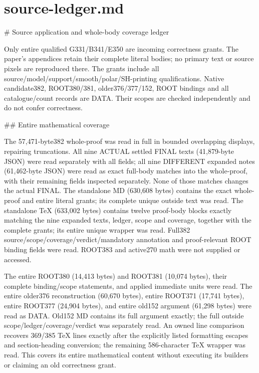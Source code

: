 \documentclass[11pt]{article}
\begin{document}
\appendix

\section{source-ledger.md}

\begin{ImportedQualifiedGrant}

# Source application and whole-body coverage ledger

Only entire qualified G331/B341/E350 are incoming correctness grants. The paper's appendices retain their complete literal bodies; no primary text or source pixels are reproduced there. The grants include all source/model/support/smooth/polar/SH-printing qualifications. Native candidate382, ROOT380/381, older376/377/152, ROOT bindings and all catalogue/count records are DATA. Their scopes are checked independently and do not confer correctness.

## Entire mathematical coverage

The 57,471-byte382 whole-proof was read in full in bounded overlapping displays, repairing truncations. All nine ACTUAL settled FINAL texts (41,879-byte JSON) were read separately with all fields; all nine DIFFERENT expanded notes (61,462-byte JSON) were read as exact full-body matches into the whole-proof, with their remaining fields inspected separately. None of those matches changes the actual FINAL. The standalone MD (630,608 bytes) contains the exact whole-proof and entire literal grants; its complete unique outside text was read. The standalone TeX (633,002 bytes) contains twelve proof-body blocks exactly matching the nine expanded texts, ledger, scope and coverage, together with the complete grants; its entire unique wrapper was read. Full382 source/scope/coverage/verdict/mandatory annotation and proof-relevant ROOT binding fields were read. ROOT383 and active270 math were not supplied or accessed.

The entire ROOT380 (14,413 bytes) and ROOT381 (10,074 bytes), their complete binding/scope statements, and applied immediate units were read. The entire older376 reconstruction (60,670 bytes), entire ROOT371 (17,741 bytes), entire ROOT377 (24,904 bytes), and entire old152 argument (61,298 bytes) were read as DATA. Old152 MD contains its full argument exactly; the full outside scope/ledger/coverage/verdict was separately read. An owned line comparison recovers 369/385 TeX lines exactly after the explicitly listed formatting escapes and section-heading conversion; the remaining 586-character TeX wrapper was read. This covers its entire mathematical content without executing its builders or claiming an old correctness grant.


\end{ImportedQualifiedGrant}
\end{document}
